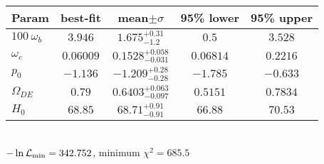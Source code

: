 \begin{tabular}{|l|c|c|c|c|} 
 \hline 
Param & best-fit & mean$\pm\sigma$ & 95\% lower & 95\% upper \\ \hline 
$100~\omega_{b }$ &$3.946$ & $1.675_{-1.2}^{+0.31}$ & $0.5$ & $3.528$ \\ 
$\omega_c$ &$0.06009$ & $0.1528_{-0.031}^{+0.058}$ & $0.06814$ & $0.2216$ \\ 
$p_{0 }$ &$-1.136$ & $-1.209_{-0.28}^{+0.28}$ & $-1.785$ & $-0.633$ \\ 
$\Omega_{DE}$ &$0.79$ & $0.6403_{-0.097}^{+0.063}$ & $0.5151$ & $0.7834$ \\ 
$H_{0 }$ &$68.85$ & $68.71_{-0.91}^{+0.91}$ & $66.88$ & $70.53$ \\ 
\hline 
 \end{tabular} \\ 
$-\ln{\cal L}_\mathrm{min} =342.752$, minimum $\chi^2=685.5$ \\ 
